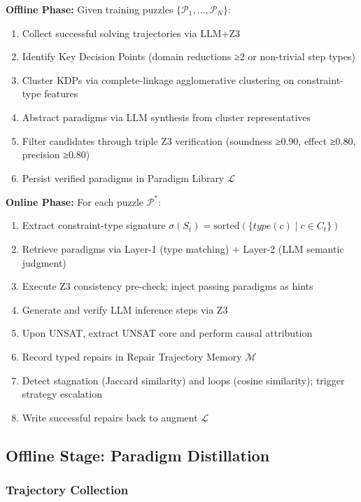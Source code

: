 \documentclass[letterpaper]{article}
\begin{document}
\textbf{Offline Phase:} Given training puzzles $\{\mathcal{P}_1, \ldots, \mathcal{P}_N\}$:
\begin{enumerate}
    \item Collect successful solving trajectories via LLM+Z3
    \item Identify Key Decision Points (domain reductions ≥2 or non-trivial step types)
    \item Cluster KDPs via complete-linkage agglomerative clustering on constraint-type features
    \item Abstract paradigms via LLM synthesis from cluster representatives
    \item Filter candidates through triple Z3 verification (soundness ≥0.90, effect ≥0.80, precision ≥0.80)
    \item Persist verified paradigms in Paradigm Library $\mathcal{L}$
\end{enumerate}

\textbf{Online Phase:} For each puzzle $\mathcal{P}^*$:
\begin{enumerate}
    \item Extract constraint-type signature $\sigma(S_t) = \text{sorted}(\{type(c) \mid c \in C_t\})$
    \item Retrieve paradigms via Layer-1 (type matching) + Layer-2 (LLM semantic judgment)
    \item Execute Z3 consistency pre-check; inject passing paradigms as hints
    \item Generate and verify LLM inference steps via Z3
    \item Upon UNSAT, extract UNSAT core and perform causal attribution
    \item Record typed repairs in Repair Trajectory Memory $\mathcal{M}$
    \item Detect stagnation (Jaccard similarity) and loops (cosine similarity); trigger strategy escalation
    \item Write successful repairs back to augment $\mathcal{L}$
\end{enumerate}

\subsection{Offline Stage: Paradigm Distillation}

\subsubsection{Trajectory Collection}
\end{document}
